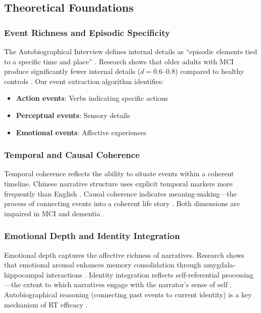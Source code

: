 \documentclass[11pt]{article}
\begin{document}
\subsection{Theoretical Foundations}

\subsubsection{Event Richness and Episodic Specificity}

The Autobiographical Interview defines internal details as ``episodic elements tied to a specific time and place'' \citep{levine2002}. Research shows that older adults with MCI produce significantly fewer internal details ($d = 0.6$--$0.8$) compared to healthy controls \citep{irish2024, barnhofer2025}. Our event extraction algorithm identifies:
\begin{itemize}
    \item \textbf{Action events}: Verbs indicating specific actions
    \item \textbf{Perceptual events}: Sensory details
    \item \textbf{Emotional events}: Affective experiences
\end{itemize}

\subsubsection{Temporal and Causal Coherence}

Temporal coherence reflects the ability to situate events within a coherent timeline. Chinese narrative structure uses explicit temporal markers more frequently than English \citep{chen2021, li2025}. Causal coherence indicates meaning-making---the process of connecting events into a coherent life story \citep{habermas2020, mcadams2024}. Both dimensions are impaired in MCI and dementia \citep{murphy2023, devito2025}.

\subsubsection{Emotional Depth and Identity Integration}

Emotional depth captures the affective richness of narratives. Research shows that emotional arousal enhances memory consolidation through amygdala-hippocampal interactions \citep{kensinger2026, reed2024}. Identity integration reflects self-referential processing---the extent to which narratives engage with the narrator's sense of self \citep{conway2023, adler2025}. Autobiographical reasoning (connecting past events to current identity) is a key mechanism of RT efficacy \citep{westerhof2024}.
\end{document}
